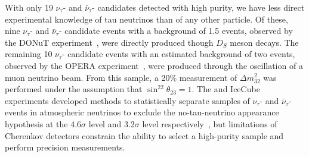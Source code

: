 

With only 19 $\nu_{\tau}$- and $\bar{\nu}_{\tau}$- candidates detected with high purity, we have less direct experimental knowledge of tau neutrinos than of any other  particle. Of these, nine $\nu_{\tau}$- and $\bar{\nu}_{\tau}$- candidate events with a background of 1.5 events, observed by the DONuT experiment~\cite{Kodama:2000mp, Kodama:2007aa}, were directly produced though $D_S$ meson decays.  The remaining 10 $\nu_{\tau}$- candidate events with an estimated background of two events, observed by the OPERA experiment~\cite{Guler:2000bd,Agafonova:2018auq}, were produced through the oscillation of a muon neutrino beam. From this sample, a 20\% measurement of $\Delta m^{2}_{32}$ was performed under the assumption that $\sin^22\theta_{23} = 1$.  The \superk and IceCube experiments developed methods to statistically separate samples of $\nu_{\tau}$- and $\bar{\nu}_{\tau}$- events in atmospheric neutrinos to exclude the no-tau-neutrino appearance hypothesis at the 4.6$\sigma$ level and 3.2$\sigma$ level respectively~\cite{Abe:2012jj, Li:2017dbe, Aartsen:2019tjl}, but limitations of Cherenkov detectors constrain the ability to select a high-purity sample and perform precision measurements.

